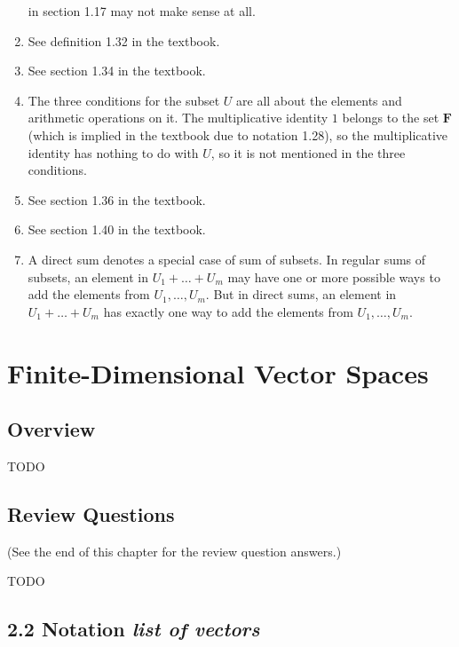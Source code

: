 \documentclass[12pt, letterpaper, oneside]{book}
\begin{document}
\begin{enumerate}
    in section 1.17 may not make sense at all.
  \item See definition 1.32 in the textbook.
  \item See section 1.34 in the textbook.
  \item The three conditions for the subset $U$ are all about the elements and
    arithmetic operations on it. The multiplicative identity $1$ belongs to the
    set $\mathbf{F}$ (which is implied in the textbook due to notation 1.28),
    so the multiplicative identity has nothing to do with $U$, so it is not
    mentioned in the three conditions.
  \item See section 1.36 in the textbook.
  \item See section 1.40 in the textbook.
  \item A direct sum denotes a special case of sum of subsets. In regular sums
    of subsets, an element in $U_1 + \ldots + U_m$ may have one or more
    possible ways to add the elements from $U_1, \ldots, U_m$. But in direct
    sums, an element in $U_1 + \ldots + U_m$ has exactly one way to add the
    elements from $U_1, \ldots, U_m$.
\end{enumerate}

%
%

\chapter{Finite-Dimensional Vector Spaces}

\section{Overview}

TODO

\section{Review Questions}

(See the end of this chapter for the review question answers.)

TODO

\section{2.2 Notation \textbf{\textit{list of vectors}}}
\end{document}
